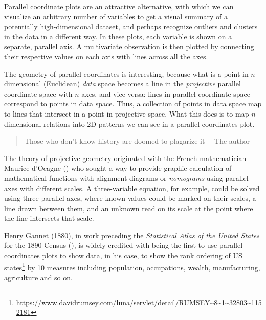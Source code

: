 \documentclass[
  letterpaper,
  10pt,
  krantz2]{krantz}
\providecommand{\href}[2]{#2\footnote{\url{#1}}}
\begin{document}
{Parallel coordinate plots are an attractive alternative, with which we
can visualize an arbitrary number of variables to get a visual summary
of a potentially high-dimensional dataset, and perhaps recognize
outliers and clusters in the data in a different way. In these plots,
each variable is shown on a separate, parallel axis. A multivariate
observation is then plotted by connecting their respective values on
each axis with lines across all the axes.

The geometry of parallel coordinates is interesting, because what is a
point in \(n\)-dimensional (Euclidean) \emph{data} space becomes a line
in the \emph{projective} parallel coordinate space with \(n\) axes, and
vice-versa: lines in parallel coordinate space correspond to points in
data space. Thus, a collection of points in data space map to lines that
intersect in a point in projective space. What this does is to map
\(n\)-dimensional relations into 2D patterns we can see in a parallel
coordinates plot.

\begin{tcolorbox}[enhanced jigsaw, colback=white, titlerule=0mm, toprule=.15mm, opacityback=0, leftrule=.75mm, opacitybacktitle=0.6, left=2mm, arc=.35mm, colframe=quarto-callout-note-color-frame, breakable, bottomtitle=1mm, toptitle=1mm, title=\textcolor{quarto-callout-note-color}{\faInfo}\hspace{0.5em}{History Corner}, rightrule=.15mm, bottomrule=.15mm, coltitle=black, colbacktitle=quarto-callout-note-color!10!white]

\begin{quote}
Those who don't know history are doomed to plagarize it ---The author
\end{quote}

The theory of projective geometry originated with the French
mathematician Maurice d'Ocagne () who
sought a way to provide graphic calculation of mathematical functions
with alignment diagrams or \emph{nomograms} using parallel axes with
different scales. A three-variable equation, for example, could be
solved using three parallel axes, where known values could be marked on
their scales, a line drawn between them, and an unknown read on its
scale at the point where the line intersects that scale.

Henry Gannet (1880), in work preceding the \emph{Statistical Atlas of
the United States} for the 1890 Census
(), is widely credited with
being the first to use parallel coordinates plots to show data, in his
case, to show the
\href{https://www.davidrumsey.com/luna/servlet/detail/RUMSEY~8~1~32803~1152181}{rank
ordering of US states} by 10 measures including population, occupations,
wealth, manufacturing, agriculture and so on.


\end{tcolorbox}}
\end{document}
